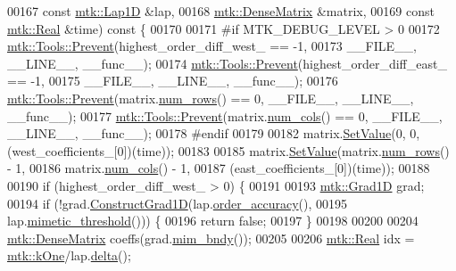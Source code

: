 \begin{DoxyCode}
00167     \textcolor{keyword}{const} \hyperlink{classmtk_1_1Lap1D}{mtk::Lap1D} &lap,
00168     \hyperlink{classmtk_1_1DenseMatrix}{mtk::DenseMatrix} &matrix,
00169     \textcolor{keyword}{const} \hyperlink{group__c01-roots_gac080bbbf5cbb5502c9f00405f894857d}{mtk::Real} &time)\textcolor{keyword}{ const }\{
00170 
00171 \textcolor{preprocessor}{  #if MTK\_DEBUG\_LEVEL > 0}
00172   \hyperlink{classmtk_1_1Tools_a332324c6f25e66be9dff48c5987a3b9f}{mtk::Tools::Prevent}(highest\_order\_diff\_west\_ == -1,
00173                       \_\_FILE\_\_, \_\_LINE\_\_, \_\_func\_\_);
00174   \hyperlink{classmtk_1_1Tools_a332324c6f25e66be9dff48c5987a3b9f}{mtk::Tools::Prevent}(highest\_order\_diff\_east\_ == -1,
00175                       \_\_FILE\_\_, \_\_LINE\_\_, \_\_func\_\_);
00176   \hyperlink{classmtk_1_1Tools_a332324c6f25e66be9dff48c5987a3b9f}{mtk::Tools::Prevent}(matrix.\hyperlink{classmtk_1_1DenseMatrix_a53f3afb3b6a8d21854458aaa9663cc74}{num\_rows}() == 0, \_\_FILE\_\_, \_\_LINE\_\_, \_\_func\_\_);
00177   \hyperlink{classmtk_1_1Tools_a332324c6f25e66be9dff48c5987a3b9f}{mtk::Tools::Prevent}(matrix.\hyperlink{classmtk_1_1DenseMatrix_a41747502d468c6728a4be31501b16e0e}{num\_cols}() == 0, \_\_FILE\_\_, \_\_LINE\_\_, \_\_func\_\_);
00178 \textcolor{preprocessor}{  #endif}
00179 
00182   matrix.\hyperlink{classmtk_1_1DenseMatrix_a784ce5784109ac86bfb9d8562b334b13}{SetValue}(0, 0, (west\_coefficients\_[0])(time));
00183 
00185   matrix.\hyperlink{classmtk_1_1DenseMatrix_a784ce5784109ac86bfb9d8562b334b13}{SetValue}(matrix.\hyperlink{classmtk_1_1DenseMatrix_a53f3afb3b6a8d21854458aaa9663cc74}{num\_rows}() - 1,
00186                   matrix.\hyperlink{classmtk_1_1DenseMatrix_a41747502d468c6728a4be31501b16e0e}{num\_cols}() - 1,
00187                   (east\_coefficients\_[0])(time));
00188 
00190   \textcolor{keywordflow}{if} (highest\_order\_diff\_west\_ > 0) \{
00191 
00193     \hyperlink{classmtk_1_1Grad1D}{mtk::Grad1D} grad;
00194     \textcolor{keywordflow}{if} (!grad.\hyperlink{classmtk_1_1Grad1D_a74ef5245cfae6fd158bd7f563a0c2e52}{ConstructGrad1D}(lap.\hyperlink{classmtk_1_1Lap1D_ae3490534a9e950df3f81b3840c31b13a}{order\_accuracy}(),
00195                               lap.\hyperlink{classmtk_1_1Lap1D_a957ae4ff6053d605ac7b93650ad6f188}{mimetic\_threshold}())) \{
00196       \textcolor{keywordflow}{return} \textcolor{keyword}{false};
00197     \}
00198 
00200 
00204     \hyperlink{classmtk_1_1DenseMatrix}{mtk::DenseMatrix} coeffs(grad.\hyperlink{classmtk_1_1Grad1D_ab25e1d064a5a00fbe3777e65fd5750c0}{mim\_bndy}());
00205 
00206     \hyperlink{group__c01-roots_gac080bbbf5cbb5502c9f00405f894857d}{mtk::Real} idx = \hyperlink{group__c01-roots_ga26407c24d43b6b95480943340d285c71}{mtk::kOne}/lap.\hyperlink{classmtk_1_1Lap1D_a4e16e80c6dd845ac42bda23385a1c56e}{delta}();

\end{DoxyCode}
